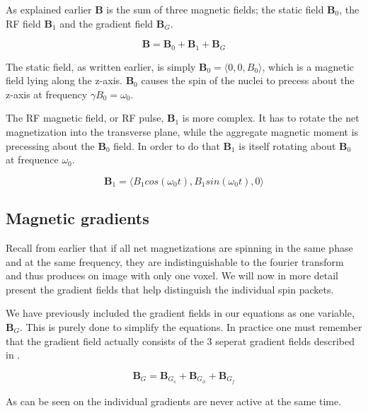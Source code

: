 

As explained earlier $\mathbf{B}$ is the sum of three magnetic fields;
the static field $\mathbf{B}_0$, the RF field $\mathbf{B}_1$ and the
gradient field $\mathbf{B}_G$.

\begin{displaymath}
  \mathbf{B} = \mathbf{B}_0 + \mathbf{B}_1 + \mathbf{B}_G
\end{displaymath}

The static field, as written earlier, is simply $\mathbf{B}_0 =
\langle 0, 0, B_0 \rangle$, which is a magnetic field lying along the
z-axis. $\mathbf{B}_0$ causes the spin of the nuclei to precess about
the z-axis at frequency $\gamma B_0 = \omega_0$.

The RF magnetic field, or RF pulse, $\mathbf{B}_1$ is more complex. It
has to rotate the net magnetization into the transverse plane, while
the aggregate magnetic moment is precessing about the $\mathbf{B}_0$
field. In order to do that $\mathbf{B}_1$ is itself rotating about
$\mathbf{B}_0$ at frequence $\omega_0$.

\begin{displaymath}
  \mathbf{B}_1 = \langle B_1 cos(\omega_0 t), B_1 sin(\omega_0 t), 0\rangle
\end{displaymath}


\subsection{Magnetic gradients}

Recall from earlier that if all net magnetizations are spinning in the
same phase and at the same frequency, they are indistinguishable to
the fourier transform and thus produces on image with only one
voxel. We will now in more detail present the gradient fields that
help distinguish the individual spin packets.

We have previously included the gradient fields in our equations as
one variable, $\mathbf{B}_G$. This is purely done to simplify the
equations. In practice one must remember that the gradient field
actually consists of the 3 seperat gradient fields described in
.

\begin{displaymath}
  \mathbf{B}_G = \mathbf{B}_{G_s} + \mathbf{B}_{G_\phi} + \mathbf{B}_{G_f}
\end{displaymath}

As can be seen on  the individual
gradients are never active at the same time.

